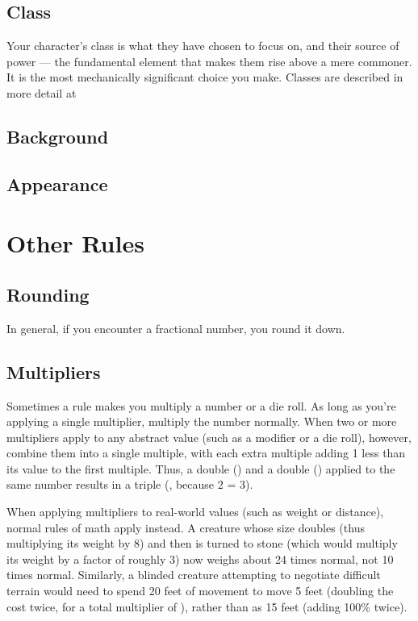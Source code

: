     \subsection{Class}
        Your character's class is what they have chosen to focus on, and their source of power --- the fundamental element that makes them rise above a mere commoner.
        It is the most mechanically significant choice you make.
        Classes are described in more detail at 

    \subsection{Background}

    \subsection{Appearance}

\section{Other Rules}

    \subsection{Rounding}
        In general, if you encounter a fractional number, you round it down.

    \subsection{Multipliers}
        Sometimes a rule makes you multiply a number or a die roll.
        As long as you're applying a single multiplier, multiply the number normally.
        When two or more multipliers apply to any abstract value (such as a modifier or a die roll), however, combine them into a single multiple, with each extra multiple adding 1 less than its value to the first multiple.
        Thus, a double () and a double () applied to the same number results in a triple (, because 2  = 3).

        When applying multipliers to real-world values (such as weight or distance), normal rules of math apply instead.
        A creature whose size doubles (thus multiplying its weight by 8) and then is turned to stone (which would multiply its weight by a factor of roughly 3) now weighs about 24 times normal, not 10 times normal.
        Similarly, a blinded creature attempting to negotiate difficult terrain would need to spend 20 feet of movement to move 5 feet (doubling the cost twice, for a total multiplier of ), rather than as 15 feet (adding 100\% twice).
